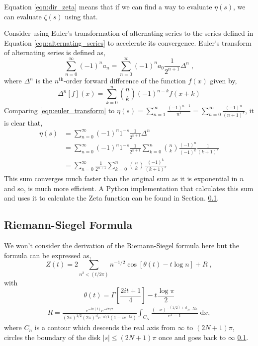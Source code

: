 \documentclass{amsproc}
\newcommand{\be}{\begin{equation}}
\newcommand{\ee}{\end{equation}}
\newcommand{\df}{\; \mathrm{d}}
\theoremstyle{definition}
\theoremstyle{remark}
\numberwithin{equation}{section}
\begin{document}
Equation \ref{eqn:dir_zeta} means that if we can find a way to evaluate $\eta(s)$, we can evaluate $\zeta(s)$ using that. 

Consider using Euler's transformation of alternating series to the series defined in Equation \ref{eqn:alternating_series} to accelerate its convergence. Euler's transform of alternating series is defined as,
\be
\label{eqn:euler_transform}
\sum_{n = 0}^{\infty} (-1)^n a_n = \sum_{n = 0}^{\infty} (-1)^n a_0 \frac{ 1 }{2^{n + 1}} \Delta^n \;,
\ee
where $\Delta^n$ is the $n^{\mathrm{th}}$-order forward difference of the function $f(x)$ given by,
\begin{equation*}
 \Delta^n[f](x) = \sum_{k = 0}^{n} {n \choose k} (-1)^{n - k} f(x + k)
\end{equation*}
Comparing \ref{eqn:euler_transform} to $\eta(s) = \sum_{n = 1}^{\infty} \frac{ (-1)^{n - 1} }{n^s} = \sum_{n = 0}^{\infty} \frac{ (-1)^n }{ (n + 1)^s }$, it is clear that,
\begin{align*}
\eta(s) &= \sum_{n=0}^{\infty} (-1)^n 1^{-s} \frac{1}{ 2^{n + 1} } \Delta^n \\
        &= \sum_{n=0}^{\infty} (-1)^n 1^{-s} \frac{1}{ 2^{n + 1} } \sum_{k=0}^{n} {n \choose k} \frac{ (-1)^n }{ (-1)^k } \frac{1}{ (k + 1)^s } \\
        &= \sum_{n=0}^{\infty} \frac{1}{ 2^{n + 1} } \sum_{k=0}^{n} {n \choose k} \frac{ (-1)^k }{ (k + 1)^s }
\end{align*}
This sum converges much faster than the original sum as it is exponential in $n$ and so, is much more efficient. A Python implementation that calculates this sum and uses it to calculate the Zeta function can be found in Section. \ref{}. 

\subsection{Riemann-Siegel Formula}
We won't consider the derivation of the Riemann-Siegel formula here but the formula can be expressed as,
\be
Z(t) = 2 \sum_{n^2 < (t / 2 \pi )} n^{-1/2} \cos{ \left[ \theta(t) - t \log{n} \right] } + R \;,
\ee
with
\begin{equation}
 \theta(t) = \Gamma\left[ \frac{ 2 i t + 1}{4} \right] - t \frac{\log{\pi}}{2}
\end{equation}
\begin{align}
R = \frac{ e^{-i\nu(t)} e^{-t \pi / 2} }{ (2 \pi)^{1/2} (2 \pi)^{it} e^{-i t / 4} \left( 1 - i e^{-t \pi} \right) } \int_{C_N} \frac{ (-x)^{-(1/2) + i t}  e^{-Nx}}{ e^x - 1} \df x,
\end{align}
where $C_n$ is a contour which descends the real axis from $\infty$ to $(2 N + 1) \pi$, circles the boundary of the disk $\left| s \right| \le (2N + 1) \pi$ once and goes back to $\infty$ \ref{}.
\end{document}
